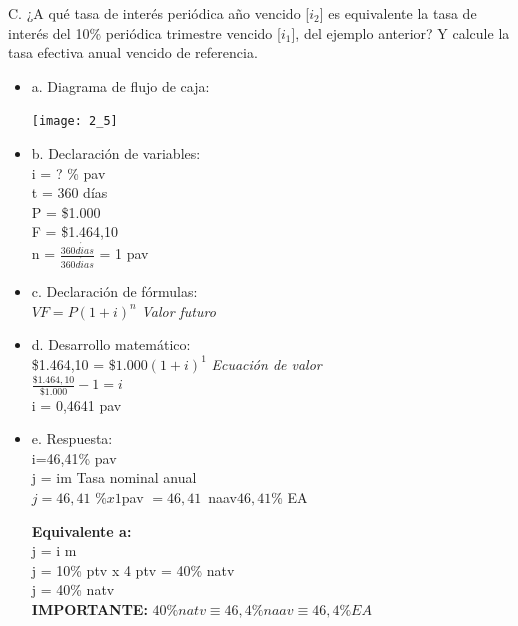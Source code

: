 C. ¿A qué tasa de interés periódica año vencido [$i_{2}$] es equivalente la tasa de interés del 10\% periódica trimestre vencido [$i_{1}$], del ejemplo anterior? Y calcule la tasa efectiva anual vencido de referencia.\\

\begin{itemize}
	\item a. Diagrama de flujo de caja:\\
	\begin{center}
		\texttt{[image: 2\_5]}\\
	\end{center}
	
	\item b. Declaración de variables:\\
	
	i = ? \% pav\\
	t = 360 días\\
	P = \$1.000\\
	F = \$1.464,10\\
	n = $\frac{360 d\acute{i}as}{360 d\acute{i}as}$ = 1 pav\\
	
	\item c. Declaración de fórmulas:\\
	
	$VF = P(1+i)^n$ \hspace{35 pt} \textit{Valor futuro}
	
	\item d. Desarrollo matemático:\\
	
	\$1.464,10 = $\$1.000(1+i)^1$ \hspace{35 pt} \textit{Ecuación de valor}\\
	
	$\frac{\$1.464,10}{\$1.000} - 1 = i$\\
	
	i = 0,4641 pav\\
	
	\item e. Respuesta:\\
	
	i=46,41\%  pav\\
	j = im Tasa nominal anual\\
    $j = 46,41$ \%$ x 1 $pav $= 46,41$\ naav\Leftrightarrow  $46,41$\% EA\ 
	
	\textbf{Equivalente a:}\\
	j = i  m\\
	j = 10\% ptv x 4 ptv = 40\% natv\\
	j = 40\% natv\\
	
	\textbf{IMPORTANTE:} $40\% natv \equiv 46,4\% naav \equiv 46,4\% EA$\\
	
\end{itemize}

